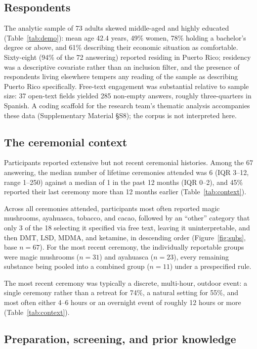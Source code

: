 \documentclass[12pt]{article}
\begin{document}
\subsection{Respondents}

The analytic sample of 73 adults skewed middle-aged and highly educated (Table~\ref{tab:demo}): mean age
42.4 years, 49\% women, 78\% holding a bachelor's degree or above, and 61\% describing their economic
situation as comfortable. Sixty-eight (94\% of the 72 answering) reported residing in Puerto Rico; residency
was a descriptive covariate rather than an inclusion filter, and the presence of respondents living
elsewhere tempers any reading of the sample as describing Puerto Rico specifically. Free-text engagement was
substantial relative to sample size: 37 open-text fields yielded 285 non-empty answers, roughly
three-quarters in Spanish. A coding scaffold for the research team's thematic analysis accompanies these
data (Supplementary Material \S S8); the corpus is not interpreted here.

\subsection{The ceremonial context}

Participants reported extensive but not recent ceremonial histories. Among the 67 answering, the median
number of lifetime ceremonies attended was 6 (IQR 3--12, range 1--250) against a median of 1 in the past 12
months (IQR 0--2), and 45\% reported their last ceremony more than 12 months earlier
(Table~\ref{tab:context}).

Across all ceremonies attended, participants most often reported magic mushrooms, ayahuasca, tobacco, and
cacao, followed by an ``other'' category that only 3 of the 18 selecting it specified via free text,
leaving it uninterpretable, and then DMT, LSD, MDMA, and ketamine, in descending order (Figure~\ref{fig:subs},
base $n=67$). For the most recent ceremony, the individually reportable groups were magic mushrooms
($n=31$) and ayahuasca ($n=23$), every remaining substance being pooled into a combined group ($n=11$) under
a prespecified rule.

The most recent ceremony was typically a discrete, multi-hour, outdoor event: a single ceremony rather than
a retreat for 74\%, a natural setting for 55\%, and most often either 4--6 hours or an overnight event of
roughly 12 hours or more (Table~\ref{tab:context}).

\subsection{Preparation, screening, and prior knowledge}
\end{document}
